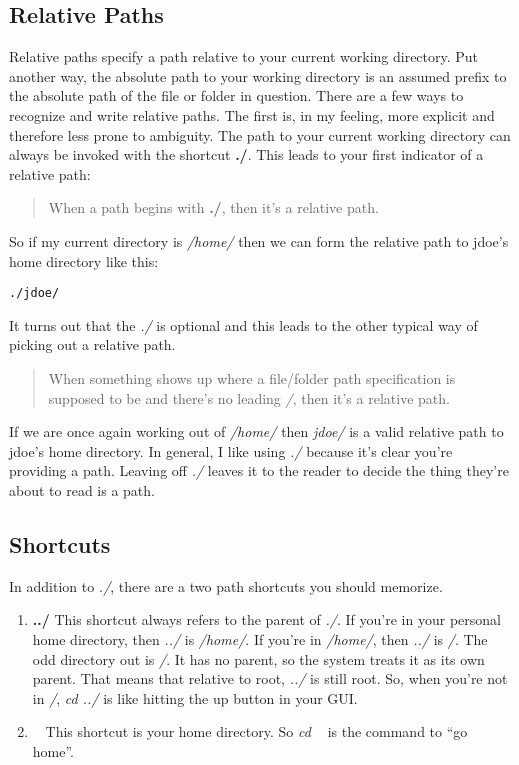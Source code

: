 \documentclass[]{tufte-handout}
\begin{document}
\subsection{Relative Paths}

Relative paths specify a path relative to your current working directory. Put another way, the absolute path to your working directory is an assumed prefix to the absolute path of the file or folder in question.  There are a few ways to recognize and write relative paths.  The first is, in my feeling, more explicit and therefore less prone to ambiguity. The path to your current working directory can always be invoked with the shortcut \textbf{./}. This leads to your first indicator of a relative path:
\begin{quote}
When a path begins with \textbf{./}, then it's a relative path.
\end{quote}
So if my current directory is \textit{/home/} then we can form the relative path to jdoe's home directory like this:
\begin{verbatim}
./jdoe/
\end{verbatim}
It turns out that the \textit{./} is optional and this leads to the other typical way of picking out a relative path.
\begin{quote}
When something shows up where a file/folder path specification is supposed to be and there's no leading \textit{/}, then it's a relative path.
\end{quote}
If we are once again working out of \textit{/home/} then \textit{jdoe/} is a valid relative path to jdoe's home directory.  In general, I like using \textit{./} because it's clear you're providing a path. Leaving off \textit{./} leaves it to the reader to decide the thing they're about to read is a path.

\subsection{Shortcuts}

In addition to \textit{./}, there are a two path shortcuts you should memorize.
\begin{enumerate}
\item \textbf{../}  \newline
This shortcut always refers to the parent of \textit{./}.  If you're in your personal home directory, then \textit{../} is \textit{/home/}. If you're in \textit{/home/}, then \textit{../} is \textit{/}. The odd directory out is \textit{/}. It has no parent, so the system treats it as its own parent.  That means that relative to root, \textit{../} is still root.  So, when you're not in \textit{/}, \textit{cd ../} is like hitting the up button in your GUI. 

\item \textbf{~} \newline
This shortcut is your home directory.  So \textit{cd ~} is the command to ``go home''.
\end{enumerate}
\end{document}
